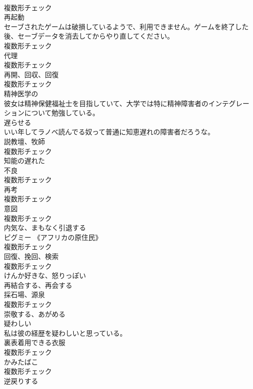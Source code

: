 \documentclass[8pt]{extreport}
\begin{document}
\begin{CJK}{UTF8}{min}
\\	複数形チェック
\\	[名詞]	再起動	
\\	セーブされたゲームは破損しているようで、利用できません。ゲームを終了した後、セーブデータを消去してからやり直してください。	
\\	複数形チェック
\\	[名詞]	代理	
\\	複数形チェック
\\	[名詞]	再開、回収、回復	
\\	複数形チェック
\\	[形容詞]	精神医学の	
\\	彼女は精神保健福祉士を目指していて、大学では特に精神障害者のインテグレーションについて勉強している。	
\\	[動詞]	遅らせる	
\\	いい年してラノベ読んでる奴って普通に知恵遅れの障害者だろうな。	
\\	[名詞]	説教壇、牧師	
\\	複数形チェック
\\	[形容詞]	知能の遅れた	
\\	[名詞]	不良	
\\	複数形チェック
\\	[名詞]	再考	
\\	複数形チェック
\\	[名詞]	意図	
\\	複数形チェック
\\	[形容詞]	内気な、まもなく引退する	
\\	[名詞]	ピグミー 《アフリカの原住⺠》	
\\	複数形チェック
\\	[名詞]	回復、挽回、検索	
\\	複数形チェック
\\	[形容詞]	けんか好きな、怒りっぽい	
\\	[動詞]	再結合する、再会する	
\\	[名詞]	採石場、源泉	
\\	複数形チェック
\\	[動詞]	崇敬する、あがめる	
\\	[形容詞]	疑わしい	
\\	私は彼の経歴を疑わしいと思っている。	
\\	[名詞]	裏表着用できる衣服	
\\	複数形チェック
\\	[名詞]	かみたばこ	
\\	複数形チェック
\\	[動詞]	逆戻りする	

\end{CJK}
\end{document}
